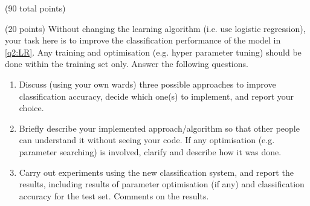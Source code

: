 \documentclass[12pt]{article}
\begin{document}
\begin{question}{(90 total points) \qTwoTitle}
\begin{subquestion}
\end{subquestion}

\begin{subquestion}{(20 points)
    Without changing the learning algorithm (i.e. use logistic regression), your task here is to improve the classification performance of the model in \ref{q2:LR}.
    Any training and optimisation (e.g. hyper parameter tuning) should be done within the training set only.
    Answer the following questions.
  }\label{q2:LR2}
  \begin{enumerate}\NARROWITEM
  \item Discuss (using your own wards) three possible approaches to improve classification accuracy, decide which one(s) to implement, and report your choice.
  \item Briefly describe your implemented approach/algorithm so that other people can understand it without seeing your code. If any optimisation (e.g. parameter searching) is involved, clarify and describe how it was done.
  \item Carry out experiments using the new classification system, and report the results, including results of parameter optimisation (if any) and classification accuracy for the test set. Comments on the results.
  \end{enumerate}
   


\end{subquestion}
\end{question}
\end{document}
